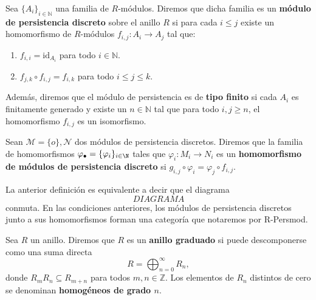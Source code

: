 \begin{definicion}
	Sea \( \{A_i\}_{i \in \mathbb{N}} \) una familia de \( R \)-módulos. Diremos que dicha familia es un \textbf{módulo de persistencia discreto} sobre el anillo \( R \) si para cada \( i \leq j \) existe un homomorfismo de \( R \)-módulos \( f_{i,j}: A_i \to A_j \) tal que:
	\begin{enumerate}
		\item \( f_{i,i} = \mathrm{id}_{A_i} \) para todo \( i \in \mathbb{N} \).
		\item \( f_{j,k} \circ f_{i,j} = f_{i,k} \) para todo \( i \leq j \leq k \).
	\end{enumerate}
	Además, diremos que el módulo de persistencia es de \textbf{tipo finito} si cada \( A_i \) es finitamente generado y existe un \( n \in \mathbb{N} \) tal que para todo \( i, j \geq n \), el homomorfismo \( f_{i,j} \) es un isomorfismo.
\end{definicion}

\begin{definicion}
	Sean $\mathcal{M} = \{o\}, \mathcal{N}$ dos módulos de persistencia discretos.  Diremos que la familia de homomorfismos $\varphi_\bullet = \{\varphi_i\}_{i \in \N}$ tales que $\varphi_i : M_i \to N_i$ es un \textbf{homomorfismo de módulos de persistencia discreto} si $g_{i,j} \circ \varphi_i = \varphi_j \circ f_{i,j}$.
\end{definicion}
La anterior definición es equivalente a decir que el diagrama
\[DIAGRAMA\]
conmuta. En las condiciones anteriores, los módulos de persistencia discretos junto a sus homomorfismos forman una categoría que notaremos por R-Persmod.

\begin{definicion}
	Sea \( R \) un anillo. Diremos que \( R \) es un \textbf{anillo graduado} si puede descomponerse como una suma directa
	\[
	R = \bigoplus_{n=0}^{\infty} R_n,
	\]
	donde \( R_m R_n \subseteq R_{m+n} \) para todos \( m, n \in \mathbb{Z} \). Los elementos de \( R_n \) distintos de cero se denominan \textbf{homogéneos de grado \( n \)}.
\end{definicion}

